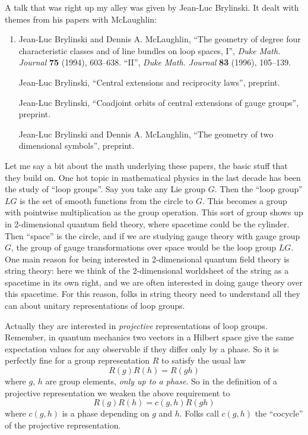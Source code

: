 \documentclass{article}
\begin{document}
A talk that was right up my alley was given by Jean-Luc Brylinski. It
dealt with themes from his papers with McLaughlin:

\begin{enumerate}
\def\labelenumi{\arabic{enumi})}
\setcounter{enumi}{1}
\item
  Jean-Luc Brylinski and Dennis A. McLaughlin, ``The geometry of degree
  four characteristic classes and of line bundles on loop spaces, I'',
  \emph{Duke Math. Journal} \textbf{75} (1994), 603--638. ``II'',
  \emph{Duke Math. Journal} \textbf{83} (1996), 105--139.

  Jean-Luc Brylinski, ``Central extensions and reciprocity laws'',
  preprint.

  Jean-Luc Brylinski, ``Coadjoint orbits of central extensions of gauge
  groups'', preprint.

  Jean-Luc Brylinski and Dennis A. McLaughlin, ``The geometry of two
  dimensional symbols'', preprint.
\end{enumerate}

Let me say a bit about the math underlying these papers, the basic stuff
that they build on. One hot topic in mathematical physics in the last
decade has been the study of ``loop groups''. Say you take any Lie group
\(G\). Then the ``loop group'' \(LG\) is the set of smooth functions
from the circle to \(G\). This becomes a group with pointwise
multiplication as the group operation. This sort of group shows up in
2-dimensional quantum field theory, where spacetime could be the
cylinder. Then ``space'' is the circle, and if we are studying gauge
theory with gauge group \(G\), the group of gauge transformations over
space would be the loop group \(LG\). One main reason for being
interested in 2-dimensional quantum field theory is string theory: here
we think of the 2-dimensional worldsheet of the string as a spacetime in
its own right, and we are often interested in doing gauge theory over
this spacetime. For this reason, folks in string theory need to
understand all they can about unitary representations of loop groups.

Actually they are interested in \emph{projective} representations of
loop groups. Remember, in quantum mechanics two vectors in a Hilbert
space give the same expectation values for any observable if they differ
only by a phase. So it is perfectly fine for a group representation
\(R\) to satisfy the usual law \[R(g)R(h) = R(gh)\] where \(g\), \(h\)
are group elements, \emph{only up to a phase}. So in the definition of a
projective representation we weaken the above requirement to
\[R(g) R(h) = c(g,h) R(gh)\] where \(c(g,h)\) is a phase depending on
\(g\) and \(h\). Folks call \(c(g,h)\) the ``cocycle'' of the projective
representation.
\end{document}
